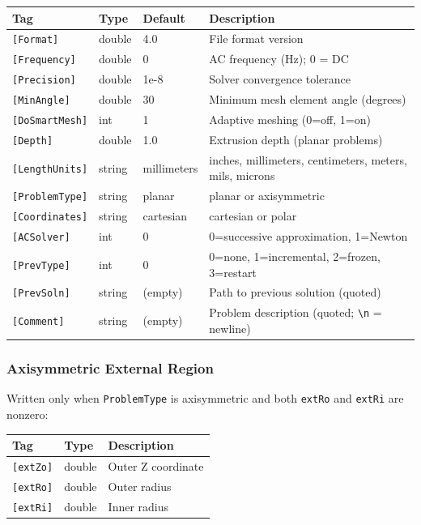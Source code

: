 \documentclass[11pt]{article}
\begin{document}
\begin{longtable}{lllp{6cm}}
\toprule
Tag & Type & Default & Description \\
\midrule
\endhead
\verb|[Format]|      & double  & 4.0        & File format version \\
\verb|[Frequency]|   & double  & 0          & AC frequency (Hz); 0 = DC \\
\verb|[Precision]|   & double  & 1e-8       & Solver convergence tolerance \\
\verb|[MinAngle]|    & double  & 30         & Minimum mesh element angle (degrees) \\
\verb|[DoSmartMesh]| & int     & 1          & Adaptive meshing (0=off, 1=on) \\
\verb|[Depth]|       & double  & 1.0        & Extrusion depth (planar problems) \\
\verb|[LengthUnits]| & string  & millimeters & inches, millimeters, centimeters, meters, mils, microns \\
\verb|[ProblemType]| & string  & planar     & planar or axisymmetric \\
\verb|[Coordinates]| & string  & cartesian  & cartesian or polar \\
\verb|[ACSolver]|    & int     & 0          & 0=successive approximation, 1=Newton \\
\verb|[PrevType]|    & int     & 0          & 0=none, 1=incremental, 2=frozen, 3=restart \\
\verb|[PrevSoln]|    & string  & (empty)    & Path to previous solution (quoted) \\
\verb|[Comment]|     & string  & (empty)    & Problem description (quoted; \verb|\n| = newline) \\
\bottomrule
\end{longtable}

\subsubsection{Axisymmetric External Region}

Written only when \verb|ProblemType| is axisymmetric and both
\verb|extRo| and \verb|extRi| are nonzero:

\begin{longtable}{llp{8cm}}
\toprule
Tag & Type & Description \\
\midrule
\verb|[extZo]| & double & Outer Z coordinate \\
\verb|[extRo]| & double & Outer radius \\
\verb|[extRi]| & double & Inner radius \\
\bottomrule
\end{longtable}
\end{document}
